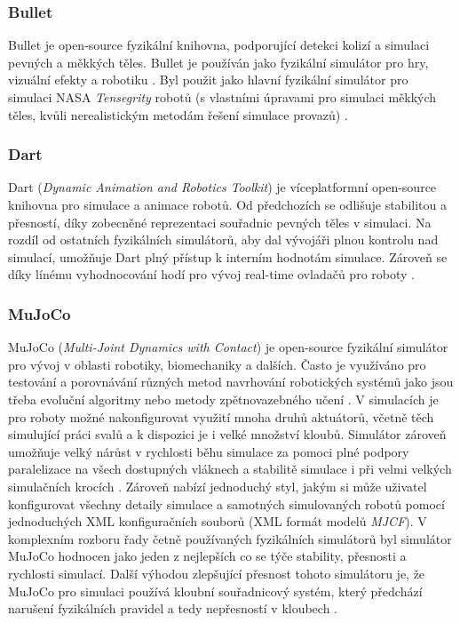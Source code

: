 \subsubsection{Bullet} \label{Bullet}
Bullet je open-source fyzikální knihovna, podporující detekci kolizí a simulaci
pevných a měkkých těles. Bullet je používán jako fyzikální simulátor pro hry,
vizuální efekty a robotiku \citep{coumans}. Byl použit jako hlavní fyzikální
simulátor pro simulaci NASA \emph{Tensegrity} robotů (s vlastními úpravami pro
simulaci měkkých těles, kvůli nerealistickým metodám řešení simulace provazů)
\citep{izadi2018simulating}.

\subsubsection{Dart} \label{Dart}
Dart (\emph{Dynamic Animation and Robotics Toolkit}) je víceplatformní
open-source knihovna pro simulace a animace robotů. Od předchozích se odlišuje
stabilitou a přesností, díky zobecněné reprezentaci souřadnic pevných těles v
simulaci. Na rozdíl od ostatních fyzikálních simulátorů, aby dal vývojáři plnou
kontrolu nad simulací, umožňuje Dart plný přístup k interním hodnotám simulace.
Zároveň se díky línému vyhodnocování hodí pro vývoj real-time ovladačů pro
roboty \citep{lee2018dart}.

\subsubsection{MuJoCo} \label{MuJoCo}
MuJoCo (\emph{Multi-Joint Dynamics with Contact}) \citep{deepmind_2021} je
open-source fyzikální simulátor pro vývoj v oblasti robotiky, biomechaniky a
dalších. Často je využíváno pro testování a porovnávání různých metod
navrhování robotických systémů jako jsou třeba evoluční algoritmy nebo metody
zpětnovazebného učení \citep{salimans2017evolution}. V simulacích je pro roboty
možné nakonfigurovat využití mnoha druhů aktuátorů, včetně těch simulující
práci svalů a k dispozici je i velké množství kloubů. Simulátor zároveň
umožňuje velký nárůst v rychlosti běhu simulace za pomoci plné podpory
paralelizace na všech dostupných vláknech a stabilitě simulace i při velmi
velkých simulačních krocích \citep{todorov2012mujoco}. Zároveň nabízí
jednoduchý styl, jakým si může uživatel konfigurovat všechny detaily simulace a
samotných simulovaných robotů pomocí jednoduchých XML konfiguračních souborů
(XML formát modelů \emph{MJCF}). V komplexním rozboru řady četně používaných
fyzikálních simulátorů byl simulátor MuJoCo hodnocen jako jeden z nejlepších co
se týče stability, přesnosti a rychlosti simulací. Další výhodou zlepšující
přesnost tohoto simulátoru je, že MuJoCo pro simulaci používá kloubní
souřadnicový systém, který předchází narušení fyzikálních pravidel a tedy
nepřesností v kloubech \citep{erez2015simulation}.

